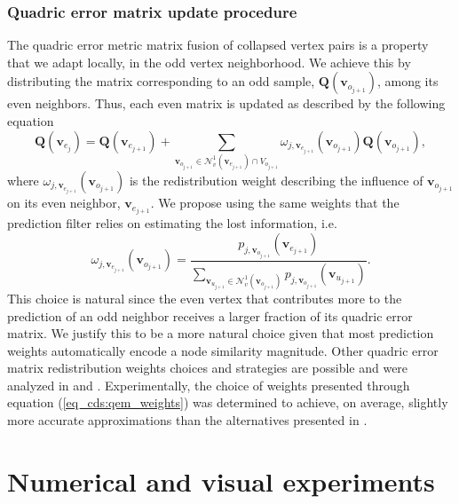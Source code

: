 \documentclass[graybox]{svmult}
\begin{document}
\subsubsection{Quadric error matrix update procedure}
The quadric error metric matrix fusion of collapsed vertex pairs is a property that we adapt locally, in the odd vertex neighborhood. We achieve this by distributing the matrix corresponding to an odd sample, $\mathbf{Q}({\mathbf{v}_{o_{j+1}}})$, among its even neighbors. Thus, each even matrix is updated as described by the following equation
\begin{equation}
\mathbf{Q}({\mathbf{v}_{e_j}}) = \mathbf{Q}({\mathbf{v}_{e_{j+1}}}) + \sum\limits_{\mathbf{v}_{o_{j+1}} \in \mathcal{N}^1_v(\mathbf{v}_{e_{j+1}}) \cap V_{o_{j+1}} } { \omega_{j, \mathbf{v}_{e_{j+1}} }(  \mathbf{v}_{o_{j+1}}) \mathbf{Q}({ \mathbf{v}_{o_{j+1}}} )} ,
\label{eq_cds:qem_update}
\end{equation}
where $\omega_{j, \mathbf{v}_{e_{j+1}} }(  \mathbf{v}_{o_{j+1}})$ is the redistribution weight describing the influence of $ \mathbf{v}_{o_{j+1}}$ on its even neighbor, $\mathbf{v}_{e_{j+1}}$. We propose using the same weights that the prediction filter relies on estimating the lost information, i.e.
\begin{equation}
\omega_{j, \mathbf{v}_{e_{j+1}} }(  \mathbf{v}_{o_{j+1}}) =  \frac{p_{j, \mathbf{v}_{o_{j+1}} }(  \mathbf{v}_{e_{j+1}})}
{ \sum_{\mathbf{v}_{u_{j+1}} \in \mathcal{N}^1_v(  \mathbf{v}_{o_{j+1}}) } { p_{j, \mathbf{v}_{o_{j+1}} }(  \mathbf{v}_{u_{j+1}}) }}.
\label{eq_cds:qem_weights}
\end{equation} 
This choice is natural since the even vertex that contributes more to the prediction of an odd neighbor receives a larger fraction of its quadric error matrix. We justify this to be a more natural choice given that most prediction weights automatically encode a node similarity magnitude.
Other quadric error matrix redistribution weights choices  and strategies are possible and were analyzed in \cite{Cioaca2015} and \cite{Cioaca2016UPB}. Experimentally, the choice of weights presented through equation (\ref{eq_cds:qem_weights}) was determined to achieve, on average, slightly more accurate approximations than the alternatives presented in \cite{Cioaca2016UPB}.


\section{Numerical and visual experiments}
\end{document}
